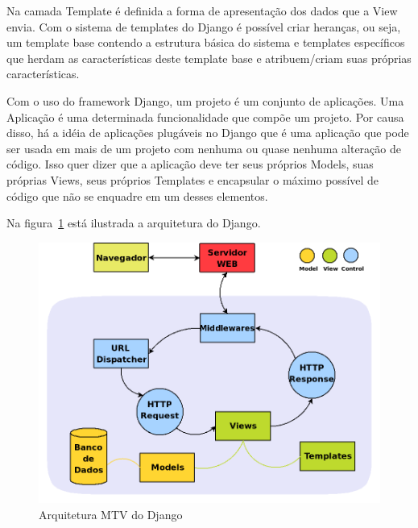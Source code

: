     Na camada Template é definida a forma de apresentação dos dados que a View envia. Com o sistema de templates do Django é possível criar heranças, ou seja, um template base contendo a estrutura básica do sistema e templates específicos que herdam as características deste template base e atribuem/criam suas próprias características.

    Com o uso do framework Django, um projeto é um conjunto de aplicações. Uma Aplicação é uma determinada funcionalidade que compõe um projeto. Por causa disso, há a idéia de aplicações plugáveis no Django que é uma aplicação que pode ser usada em mais de um projeto com nenhuma ou quase nenhuma alteração de código. Isso quer dizer que a aplicação deve ter seus próprios Models, suas próprias Views, seus próprios Templates e encapsular o máximo possível de código que não se enquadre em um desses elementos.
    
    Na figura~\ref{django_arquitetura} está ilustrada a arquitetura do Django.

    \begin{figure}
        \begin{center}
    \includegraphics[width=1.0\linewidth]{arquivos/django_arquitetura.png}
        \end{center}
        \caption{Arquitetura MTV do Django}
        \label{django_arquitetura}
    \end{figure}
